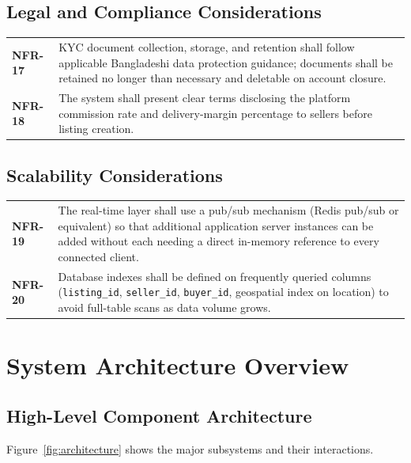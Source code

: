 \documentclass[11pt,a4paper]{report}
\newenvironment{reqtable}{\begin{longtable}{p{2.2cm}p{11.5cm}}}{\end{longtable}}
\begin{document}
\section{Legal and Compliance Considerations}
\begin{reqtable}
\textbf{NFR-17} & KYC document collection, storage, and retention shall follow applicable Bangladeshi data protection guidance; documents shall be retained no longer than necessary and deletable on account closure. \\
\textbf{NFR-18} & The system shall present clear terms disclosing the platform commission rate and delivery-margin percentage to sellers before listing creation. \\
\end{reqtable}

\section{Scalability Considerations}
\begin{reqtable}
\textbf{NFR-19} & The real-time layer shall use a pub/sub mechanism (Redis pub/sub or equivalent) so that additional application server instances can be added without each needing a direct in-memory reference to every connected client. \\
\textbf{NFR-20} & Database indexes shall be defined on frequently queried columns (\texttt{listing\_id}, \texttt{seller\_id}, \texttt{buyer\_id}, geospatial index on location) to avoid full-table scans as data volume grows. \\
\end{reqtable}

\chapter{System Architecture Overview}

\section{High-Level Component Architecture}
Figure~\ref{fig:architecture} shows the major subsystems and their interactions.
\end{document}

